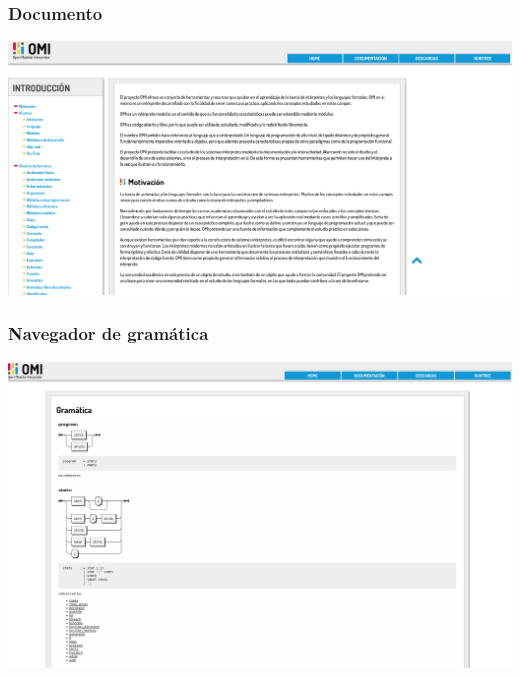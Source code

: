 \subsubsection{Documento}
\begin{center}
\includegraphics[scale=0.2]{doc-content-x.png} \\
\end{center}

\subsubsection{Navegador de gramática}
\begin{center}
\includegraphics[scale=0.2]{gramatic-x.png} \\
\end{center}

